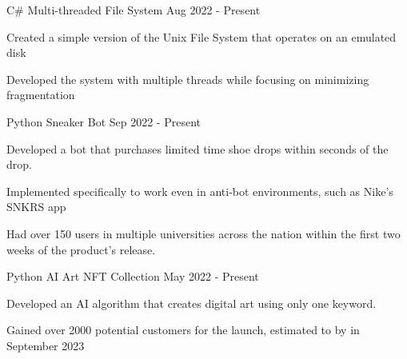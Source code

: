 

\begin{cventries}

  \cventry
    {C\#} %
    {Multi-threaded File System} %
    {} %
    {Aug 2022 - Present} %
    {
      \begin{cvitems} %
        \item {Created a simple version of the Unix File System that operates on an emulated disk}
        \item {Developed the system with multiple threads while focusing on minimizing fragmentation}
      \end{cvitems}
    }


  \cventry
    {Python} %
    {Sneaker Bot} %
    {} %
    {Sep 2022 - Present} %
    {
      \begin{cvitems} %
        \item {Developed a bot that purchases limited time shoe drops within seconds of the drop.}
        \item {Implemented specifically to work even in anti-bot environments, such as Nike's SNKRS app}
        \item {Had over 150 users in multiple universities across the nation within the first two weeks of the product's release.}
      \end{cvitems}
    }

  \cventry
    {Python} %
    {AI Art NFT Collection} %
    {} %
    {May 2022 - Present} %
    {
      \begin{cvitems} %
        \item {Developed an AI algorithm that creates digital art using only one keyword.}
        \item {Gained over 2000 potential customers for the launch, estimated to by in September 2023}
      \end{cvitems}
    }
\end{cventries}
